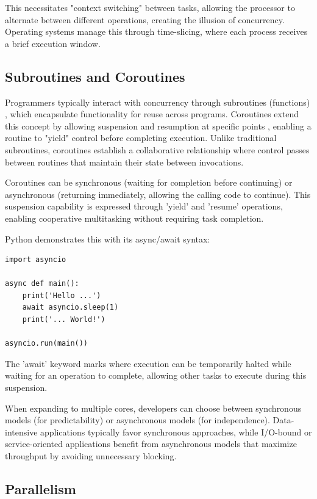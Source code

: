 \documentclass[12pt,a4paper]{article}
\begin{document}
This necessitates "context switching"\parencite[p. 4]{Rauber2023} between tasks, allowing the processor to alternate between different operations, creating the illusion of concurrency. Operating systems manage this through time-slicing, where each process receives a brief execution window.

\subsection{Subroutines and Coroutines}

Programmers typically interact with concurrency through subroutines (functions) \parencite{Pyeatt2020}, which encapsulate functionality for reuse across programs. Coroutines extend this concept by allowing suspension and resumption at specific points \parencite{DeMouna2009}, enabling a routine to "yield" control before completing execution. Unlike traditional subroutines, coroutines establish a collaborative relationship where control passes between routines that maintain their state between invocations.

Coroutines can be synchronous (waiting for completion before continuing) or asynchronous (returning immediately, allowing the calling code to continue). This suspension capability is expressed through 'yield' and 'resume' operations, enabling cooperative multitasking without requiring task completion.

Python demonstrates this with its async/await syntax:
\begin{verbatim}
import asyncio

async def main():
    print('Hello ...')
    await asyncio.sleep(1)
    print('... World!')

asyncio.run(main())
\end{verbatim}

The 'await' keyword marks where execution can be temporarily halted while waiting for an operation to complete, allowing other tasks to execute during this suspension.

When expanding to multiple cores, developers can choose between synchronous models (for predictability) or asynchronous models (for independence). Data-intensive applications typically favor synchronous approaches, while I/O-bound or service-oriented applications benefit from asynchronous models that maximize throughput by avoiding unnecessary blocking.

\subsection{Parallelism}
\end{document}
